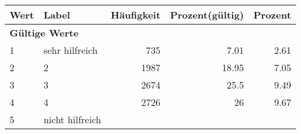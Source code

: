      \begin{longtable}{lXrrr}
     \toprule
     \textbf{Wert} & \textbf{Label} & \textbf{Häufigkeit} & \textbf{Prozent(gültig)} & \textbf{Prozent} \\
     \endhead
     \midrule
     \multicolumn{5}{l}{\textbf{Gültige Werte}}\\

     1 &
     \multicolumn{1}{X}{ sehr hilfreich   } &


       \num{735} &
       \num[round-mode=places,round-precision=2]{7.01} &
         \num[round-mode=places,round-precision=2]{2.61} \\

     2 &
     \multicolumn{1}{X}{ 2   } &


       \num{1987} &
       \num[round-mode=places,round-precision=2]{18.95} &
         \num[round-mode=places,round-precision=2]{7.05} \\

     3 &
     \multicolumn{1}{X}{ 3   } &


       \num{2674} &
       \num[round-mode=places,round-precision=2]{25.5} &
         \num[round-mode=places,round-precision=2]{9.49} \\

     4 &
     \multicolumn{1}{X}{ 4   } &


       \num{2726} &
       \num[round-mode=places,round-precision=2]{26} &
         \num[round-mode=places,round-precision=2]{9.67} \\

     5 &
     \multicolumn{1}{X}{ nicht hilfreich   } &



\end{longtable}
